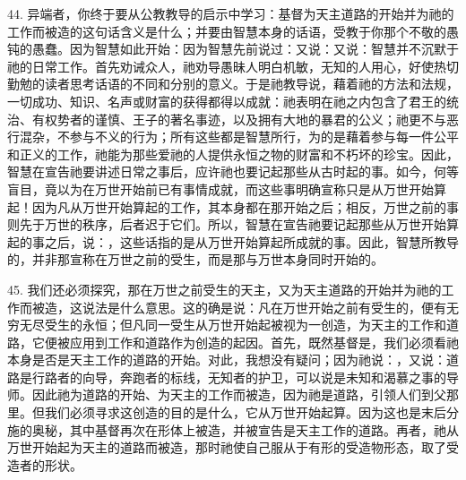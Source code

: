 44. 异端者，你终于要从公教教导的启示中学习：基督为天主道路的开始并为祂的工作而被造的这句话含义是什么；并要由智慧本身的话语，受教于你那个不敬的愚钝的愚蠢。因为智慧如此开始：因为智慧先前说过：又说：又说：智慧并不沉默于祂的日常工作。首先劝诫众人，祂劝导愚昧人明白机敏，无知的人用心，好使热切勤勉的读者思考话语的不同和分别的意义。于是祂教导说，藉着祂的方法和法规，一切成功、知识、名声或财富的获得都得以成就：祂表明在祂之内包含了君王的统治、有权势者的谨慎、王子的著名事迹，以及拥有大地的暴君的公义；祂更不与恶行混杂，不参与不义的行为；所有这些都是智慧所行，为的是藉着参与每一件公平和正义的工作，祂能为那些爱祂的人提供永恒之物的财富和不朽坏的珍宝。因此，智慧在宣告祂要讲述日常之事后，应许祂也要记起那些从古时起的事。如今，何等盲目，竟以为在万世开始前已有事情成就，而这些事明确宣称只是从万世开始算起！因为凡从万世开始算起的工作，其本身都在那开始之后；相反，万世之前的事则先于万世的秩序，后者迟于它们。所以，智慧在宣告祂要记起那些从万世开始算起的事之后，说：，这些话指的是从万世开始算起所成就的事。因此，智慧所教导的，并非那宣称在万世之前的受生，而是那与万世本身同时开始的。\par

45. 我们还必须探究，那在万世之前受生的天主，又为天主道路的开始并为祂的工作而被造，这说法是什么意思。这的确是说：凡在万世开始之前有受生的，便有无穷无尽受生的永恒；但凡同一受生从万世开始起被视为一创造，为天主的工作和道路，它便被应用到工作和道路作为创造的起因。首先，既然基督是，我们必须看祂本身是否是天主工作的道路的开始。对此，我想没有疑问；因为祂说：，又说：道路是行路者的向导，奔跑者的标线，无知者的护卫，可以说是未知和渴慕之事的导师。因此祂为道路的开始、为天主的工作而被造，因为祂是道路，引领人们到父那里。但我们必须寻求这创造的目的是什么，它从万世开始起算。因为这也是末后分施的奥秘，其中基督再次在形体上被造，并被宣告是天主工作的道路。再者，祂从万世开始起为天主的道路而被造，那时祂使自己服从于有形的受造物形态，取了受造者的形状。\par

